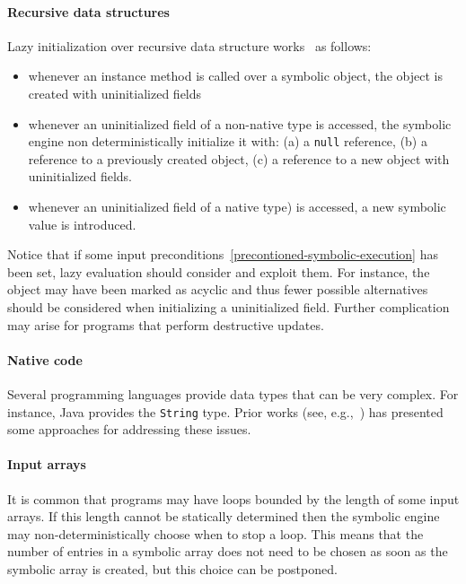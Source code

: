 \paragraph{Recursive data structures} Lazy initialization over recursive data structure works~\cite{PV-JSTTT09} as follows:
\begin{itemize}
  \item whenever an instance method is called over a symbolic object, the object is created with uninitialized fields
  \item whenever an uninitialized field of a non-native type is accessed, the symbolic engine non deterministically initialize it with: (a) a {\tt null} reference, (b) a reference to a previously created object, (c) a reference to a new object with uninitialized fields. 
  \item whenever an uninitialized field of a native type) is accessed, a new symbolic value is introduced. 
\end{itemize}


Notice that if some input preconditions~\ref{precontioned-symbolic-execution} has been set, lazy evaluation should consider and exploit them. For instance, the object may have been marked as acyclic and thus fewer possible alternatives should be considered when initializing a uninitialized field. Further complication~\cite{PV-JSTTT09} may arise for programs that perform destructive updates. 

\paragraph{Native code} Several programming languages provide data types that can be very complex. For instance, Java provides the {\tt String} type. Prior works (see, e.g.,~\cite{SHZ-TAIC07}) has presented some approaches for addressing these issues.
\fi



\paragraph{Input arrays}
It is common that programs may have loops bounded by the length of some input arrays. If this length cannot be statically determined then the symbolic engine may non-deterministically choose when to stop a loop. This means that the number of entries in a symbolic array does not need to be chosen as soon as the symbolic array is created, but this choice can be postponed.